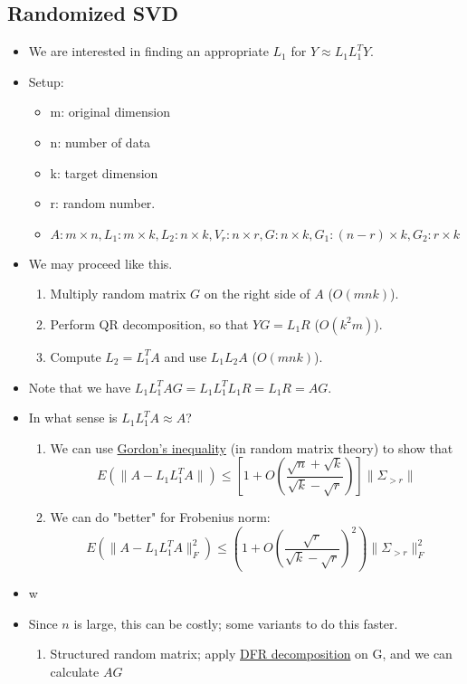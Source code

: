 \documentclass[11pt,reqno]{amsart}
\theoremstyle{remark}
\begin{document}
\subsection*{Randomized SVD}
\begin{itemize}
\item We are interested in finding an appropriate $L_1$ for $Y\approx L_1 L_1^T Y$.
\item Setup:
\begin{itemize}
\item m: original dimension
\item n: number of data
\item k: target dimension
\item r: random number. 
\item $A:m\times n,L_1:m\times k, L_2: n\times k, V_r:n\times r, G: n\times k, G_1:(n-r)\times k,G_2:r\times k$
\end{itemize}
\item We may proceed like this.
\begin{enumerate}
\item Multiply random matrix $G$ on the right side of $A$ ($O(mnk)$).
\item Perform QR decomposition, so that $YG=L_1 R$ ($O(k^2m)$).
\item Compute $L_2=L_1^T A$ and use $L_1 L_2A$ ($O(mnk)$).
\end{enumerate}
\item Note that we have $L_1L_1^TAG=L_1L_1^TL_1R=L_1R=AG$.
\item In what sense is $L_1 L_1^T A\approx A$?
\begin{enumerate}
\item We can use \href{https://www.math.uci.edu/~rvershyn/teaching/2006-07/280/lec10.pdf}{Gordon's inequality}
(in random matrix theory) to show that
\[
E(\lVert A-L_1L_1^T A\rVert)\leq [1+O(\frac{\sqrt{n}
+\sqrt{k}}{\sqrt{k}-\sqrt{r}})]\lVert \Sigma_{>r}\rVert
\]
\item We can do "better" for Frobenius norm:
\[
E(\lVert A-L_1L_1^T A\rVert_F^2)\leq (1+O(\frac{\sqrt{r}}{\sqrt{k}
-\sqrt{r}})^2)\lVert\Sigma_{>r}\rVert_F^2
\]
\end{enumerate}
\item w
\item Since $n$ is large, this can be costly; some variants to do this faster.
\begin{enumerate}
\item Structured random matrix; apply \href{https://www.mathc.rwth-aachen.de/~rauhut/files/LinzRauhut.pdf}{DFR decomposition} on G, and we can calculate $AG$

\end{enumerate}
\end{itemize}
\end{document}
